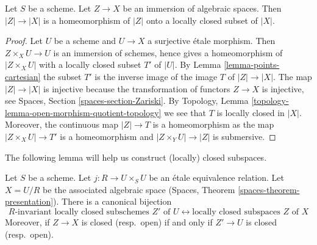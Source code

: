 \begin{lemma}
\label{lemma-subspace-induced-topology}
Let $S$ be a scheme. Let $Z \to X$ be an immersion of algebraic spaces.
Then $|Z| \to |X|$ is a homeomorphism of $|Z|$ onto a locally closed subset
of $|X|$.
\end{lemma}

\begin{proof}
Let $U$ be a scheme and $U \to X$ a surjective \'etale morphism.
Then $Z \times_X U \to U$ is an immersion of schemes, hence gives a
homeomorphism of $|Z \times_X U|$ with a locally closed subset $T'$
of $|U|$. By Lemma \ref{lemma-points-cartesian} the subset
$T'$ is the inverse image of the image $T$ of $|Z| \to |X|$.
The map $|Z| \to |X|$ is injective because the transformation of
functors $Z \to X$ is injective, see
Spaces, Section \ref{spaces-section-Zariski}. By
Topology, Lemma \ref{topology-lemma-open-morphism-quotient-topology}
we see that $T$ is locally closed in $|X|$. Moreover, the continuous
map $|Z| \to T$ is a homeomorphism as the map $|Z \times_X U| \to T'$
is a homeomorphism and $|Z \times_Y U| \to |Z|$ is submersive.
\end{proof}

\noindent
The following lemma will help us construct
(locally) closed subspaces.

\begin{lemma}
\label{lemma-subspaces-presentation}
Let $S$ be a scheme. Let $j : R \to U \times_S U$ be an \'etale equivalence
relation. Let $X = U/R$ be the associated algebraic space
(Spaces, Theorem \ref{spaces-theorem-presentation}). There is a
canonical bijection
$$
R\text{-invariant locally closed subschemes }Z'\text{ of }U
\leftrightarrow
\text{locally closed subspaces }Z\text{ of }X
$$
Moreover, if $Z \to X$ is closed (resp.\ open) if and only if
$Z' \to U$ is closed (resp.\ open).
\end{lemma}

